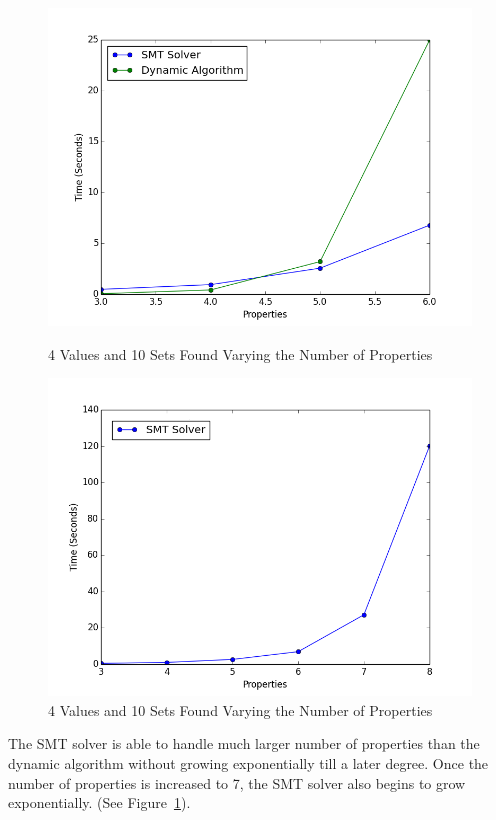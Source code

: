 \documentclass[pageno]{jpaper}
\begin{document}
\begin{figure}[htbb]
\begin{minipage}[b]{0.5\linewidth}
\centering
\includegraphics[width=.75\linewidth]{DvSPROP-v4p3456n10.png}
\caption{4 Values and 10 Sets Found Varying the Number of Properties}
\label{fig:DvSPROP}
\end{minipage}
\hspace{0.5cm}
\begin{minipage}[b]{0.5\linewidth}
\centering
\includegraphics[width=.75\linewidth]{SMTOnlyPROP-v4p345678n10.png}
\caption{4 Values and 10 Sets Found Varying the Number of Properties}
\label{fig:SMTProp}
\end{minipage}
\end{figure}

The SMT solver is able to handle much larger number of properties than the dynamic algorithm without growing exponentially till a later degree. Once the number of properties is increased to 7, the SMT solver also begins to grow exponentially. (See Figure~\ref{fig:SMTProp}).
\end{document}
